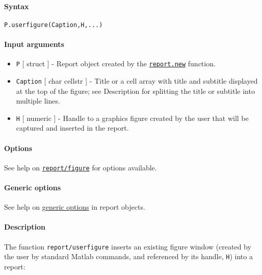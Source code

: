 


	\paragraph{Syntax}\label{syntax}

\begin{verbatim}
P.userfigure(Caption,H,...)
\end{verbatim}

\paragraph{Input arguments}\label{input-arguments}

\begin{itemize}
\item
  \texttt{P} {[} struct {]} - Report object created by the
  \href{report/new}{\texttt{report.new}} function.
\item
  \texttt{Caption} {[} char \textbar{} cellstr {]} - Title or a cell
  array with title and subtitle displayed at the top of the figure; see
  Description for splitting the title or subtitle into multiple lines.
\item
  \texttt{H} {[} numeric {]} - Handle to a graphics figure created by
  the user that will be captured and inserted in the report.
\end{itemize}

\paragraph{Options}\label{options}

See help on \href{report/figure}{\texttt{report/figure}} for options
available.

\paragraph{Generic options}\label{generic-options}

See help on \href{report/Contents}{generic options} in report objects.

\paragraph{Description}\label{description}

The function \texttt{report/userfigure} inserts an existing figure
window (created by the user by standard Matlab commands, and referenced
by its handle, \texttt{H}) into a report:

